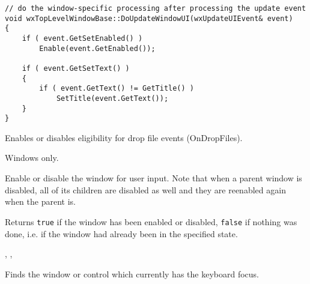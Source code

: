 \begin{verbatim}
// do the window-specific processing after processing the update event
void wxTopLevelWindowBase::DoUpdateWindowUI(wxUpdateUIEvent& event)
{
    if ( event.GetSetEnabled() )
        Enable(event.GetEnabled());

    if ( event.GetSetText() )
    {
        if ( event.GetText() != GetTitle() )
            SetTitle(event.GetText());
    }
}
\end{verbatim}



\label{wxwindowdragacceptfiles}


Enables or disables eligibility for drop file events (OnDropFiles).




Windows only.


\label{wxwindowenable}


Enable or disable the window for user input. Note that when a parent window is
disabled, all of its children are disabled as well and they are reenabled again
when the parent is.




Returns {\tt true} if the window has been enabled or disabled, {\tt false} if
nothing was done, i.e. if the window had already been in the specified state.


,\rtfsp
{},\rtfsp
{}


\label{wxwindowfindfocus}


Finds the window or control which currently has the keyboard focus.

